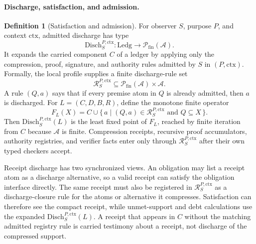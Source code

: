 \documentclass[11pt,twoside]{article}
\theoremstyle{definition}
\newtheorem{definition}[theorem]{Definition}
\newcommand{\Disch}{\mathrm{Disch}}
\newcommand{\Atoms}{\mathcal{A}}
\newcommand{\Ledg}{\mathrm{Ledg}}
\newcommand{\ctx}{\mathrm{ctx}}
\begin{document}
\paragraph{Discharge, satisfaction, and admission.}
\begin{definition}[Satisfaction and admission]
For observer $S$, purpose $P$, and context $\ctx$, admitted discharge has type
\[
  \Disch_S^{P,\ctx}:\Ledg\to\mathcal P_{\mathrm{fin}}(\Atoms).
\]
It expands the carried component $C$ of a ledger by applying only the
compression, proof, signature, and authority rules admitted by $S$ in
$(P,\ctx)$. Formally, the local profile supplies a finite discharge-rule set
\[
  \mathcal R_S^{P,\ctx}\subseteq
  \mathcal P_{\mathrm{fin}}(\Atoms)\times\Atoms .
\]
A rule $(Q,a)$ says that if every premise atom in $Q$ is already admitted, then
$a$ is discharged. For $L=(C,D,B,R)$, define the monotone finite operator
\[
  F_L(X)=C\cup
  \{\,a\mid (Q,a)\in\mathcal R_S^{P,\ctx}\text{ and }Q\subseteq X\,\}.
\]
Then $\Disch_S^{P,\ctx}(L)$ is the least fixed point of $F_L$, reached by
finite iteration from $C$ because $\Atoms$ is finite. Compression receipts,
recursive proof accumulators, authority registries, and verifier facts enter
only through $\mathcal R_S^{P,\ctx}$ after their own typed checkers accept.

Receipt discharge has two synchronized views. An obligation may list a receipt
atom as a discharge alternative, so a valid receipt can satisfy the obligation
interface directly. The same receipt must also be registered in
$\mathcal R_S^{P,\ctx}$ as a discharge-closure rule for the atoms or
alternative it compresses. Satisfaction can therefore see the compact receipt,
while unmet-support and debt calculations use the expanded
$\Disch_S^{P,\ctx}(L)$. A receipt that appears in $C$ without the matching
admitted registry rule is carried testimony about a receipt, not discharge of
the compressed support.


\end{definition}
\end{document}
